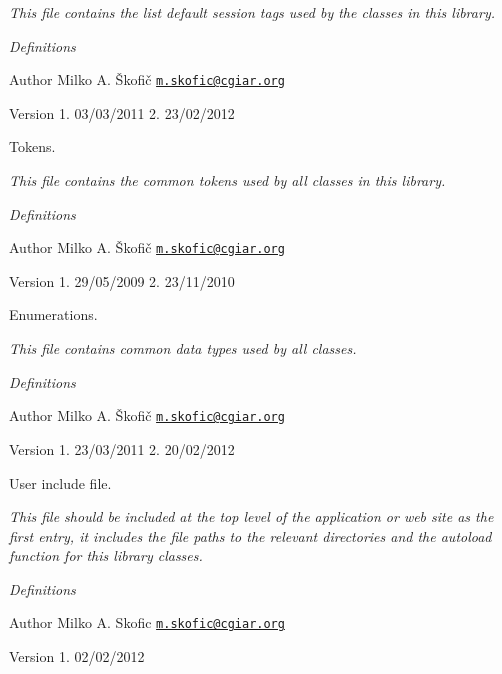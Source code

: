 {\itshape This file contains the list default session tags used by the classes in this library.}

{\itshape  Definitions}

{\itshape \begin{DoxyAuthor}{Author}
Milko A. Škofič \href{mailto:m.skofic@cgiar.org}{\tt m.\-skofic@cgiar.\-org} 
\end{DoxyAuthor}
\begin{DoxyVersion}{Version}
1. 03/03/2011 2. 23/02/2012
\end{DoxyVersion}
Tokens.}

{\itshape This file contains the common tokens used by all classes in this library.}

{\itshape  Definitions}

{\itshape \begin{DoxyAuthor}{Author}
Milko A. Škofič \href{mailto:m.skofic@cgiar.org}{\tt m.\-skofic@cgiar.\-org} 
\end{DoxyAuthor}
\begin{DoxyVersion}{Version}
1. 29/05/2009 2. 23/11/2010
\end{DoxyVersion}
Enumerations.}

{\itshape This file contains common data types used by all classes.}

{\itshape  Definitions}

{\itshape \begin{DoxyAuthor}{Author}
Milko A. Škofič \href{mailto:m.skofic@cgiar.org}{\tt m.\-skofic@cgiar.\-org} 
\end{DoxyAuthor}
\begin{DoxyVersion}{Version}
1. 23/03/2011 2. 20/02/2012
\end{DoxyVersion}
User include file.}

{\itshape This file should be included at the top level of the application or web site as the first entry, it includes the file paths to the relevant directories and the autoload function for this library classes.}

{\itshape  Definitions}

{\itshape \begin{DoxyAuthor}{Author}
Milko A. Skofic \href{mailto:m.skofic@cgiar.org}{\tt m.\-skofic@cgiar.\-org} 
\end{DoxyAuthor}
\begin{DoxyVersion}{Version}
1. 02/02/2012 
\end{DoxyVersion}
}